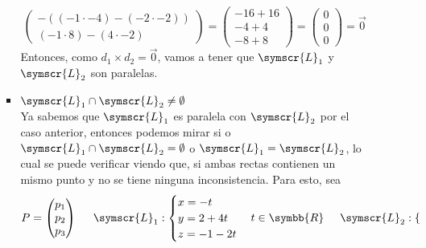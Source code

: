 \documentclass{article}
\def\fancyL{\symscr{L}}
\def\realR{\symbb{R}}
\begin{document}
\begin{enumerate}
\begin{itemize}
\begin{itemize}
\[\begin{pmatrix}
                            -\left( (-1 \cdot -4) - (-2 \cdot -2) \right) \\
                            (-1 \cdot 8) - (4 \cdot -2)
                        \end{pmatrix}
                        =
                        \begin{pmatrix}
                            -16 + 16 \\
                            -4 + 4 \\
                            -8 + 8
                        \end{pmatrix}
                        =
                        \begin{pmatrix}
                            0 \\ 0 \\ 0
                        \end{pmatrix}
                        = 
                        \vec{0}
                    \]
                    Entonces, como \(d_1 \times d_2 = \vec{0}\), vamos a tener que \(\fancyL_1\) y \(\fancyL_2\) son paralelas.
                \item \(\fancyL_1 \cap \fancyL_2 \neq \emptyset\) \\
                    Ya sabemos que \(\fancyL_1\) es paralela con \(\fancyL_2\) por el caso anterior, entonces podemos mirar si o
                    \(\fancyL_1 \cap \fancyL_2 = \emptyset\) o \(\fancyL_1 = \fancyL_2\), lo cual se puede verificar viendo que, 
                    si ambas rectas contienen un mismo punto y no se tiene ninguna inconsistencia. Para esto, sea 
                    \[
                        P = \begin{pmatrix}
                            p_1 \\ p_2 \\ p_3
                        \end{pmatrix}
                        \hspace{0.5cm}
                        \fancyL_1:
                        \begin{cases}
                            x = -t \\
                            y = 2 + 4t \\
                            z = -1 -2t 
                        \end{cases}
                        t \in \realR
                        \hspace{0.5cm}
                        \fancyL_2:
                        \begin{cases}

\end{cases}\]
\end{itemize}
\end{itemize}
\end{enumerate}
\end{document}
